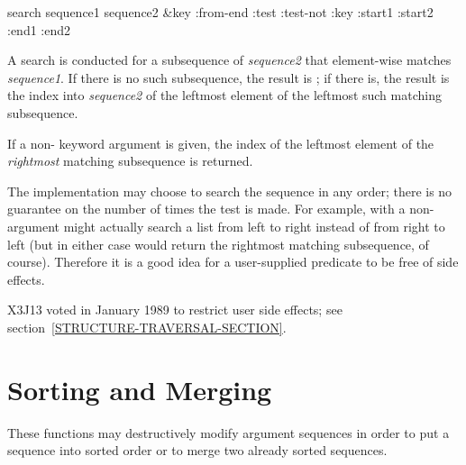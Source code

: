 \begin{defun}[Function]
search sequence1 sequence2 &key :from-end :test :test-not :key :start1 :start2 :end1 :end2

A search is conducted for a subsequence of {\it sequence2} that
element-wise matches {\it sequence1}.
If there is no such subsequence, the result is {\false}; if there is,
the result is the index into {\it sequence2} of the leftmost element
of the leftmost such matching subsequence.

If a non-{\false}  keyword argument is given,
the index of the leftmost
element of the {\it rightmost} matching subsequence is returned.

The implementation may choose to search the sequence in any order;
there is no guarantee on the number of times the test is made.
For example,  with a non-{\nil} 
argument might actually search a list from left to right
instead of from right to left (but in either case would return
the rightmost matching subsequence, of course).  Therefore it is a good
idea for a user-supplied predicate to be free of side effects.

\begin{new}
X3J13 voted in January 1989
to restrict user side effects; see section~\ref{STRUCTURE-TRAVERSAL-SECTION}.
\end{new}
\end{defun}

\section{Sorting and Merging}

These functions may destructively modify argument sequences
in order to put a sequence into sorted order or to merge two
already sorted sequences.

